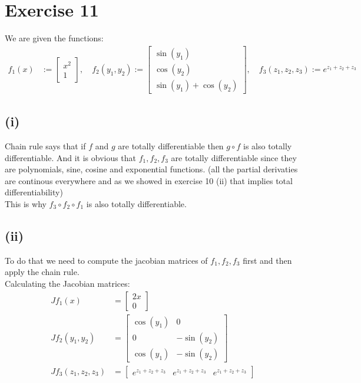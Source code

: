 \documentclass{article}
\begin{document}
\section*{Exercise 11}
We are given the functions:
\begin{align*}
   f_1(x) &:= \begin{bmatrix}
      x^2 \\
      1
   \end{bmatrix}, \quad f_2(y_1, y_2) := \begin{bmatrix}
      \sin(y_1) \\
      \cos(y_2) \\
      \sin(y_1) + \cos(y_2)
   \end{bmatrix}, \quad f_3(z_1, z_2, z_3) := e^{z_1 + z_2 + z_3}
\end{align*}

\subsection*{(i)}
Chain rule says that if \(f\) and \(g\) are totally differentiable then \(g \circ f\) is also totally differentiable. And it is obvious that \(f_1, f_2, f_3\) are totally differentiable since they are polynomials, sine, cosine and exponential functions.
(all the partial derivaties are continous everywhere and as we showed in exercise 10 (ii) that implies total differentiability) \\
This is why \(f_3 \circ f_2 \circ f_1\) is also totally differentiable.

\subsection*{(ii)}
To do that we need to compute the jacobian matrices of \(f_1, f_2, f_3\) first and then apply the chain rule. \\
Calculating the Jacobian matrices:
\begin{align*}
   Jf_1(x) &= \begin{bmatrix}
      2x \\
      0
   \end{bmatrix} \\
   Jf_2(y_1, y_2) &= \begin{bmatrix}
      \cos(y_1) & 0 \\
      0 & -\sin(y_2) \\
      \cos(y_1) & -\sin(y_2)
   \end{bmatrix} \\
   Jf_3(z_1, z_2, z_3) &= \begin{bmatrix}
      e^{z_1 + z_2 + z_3} & e^{z_1 + z_2 + z_3} & e^{z_1 + z_2 + z_3}
   \end{bmatrix}
\end{align*}
\end{document}
